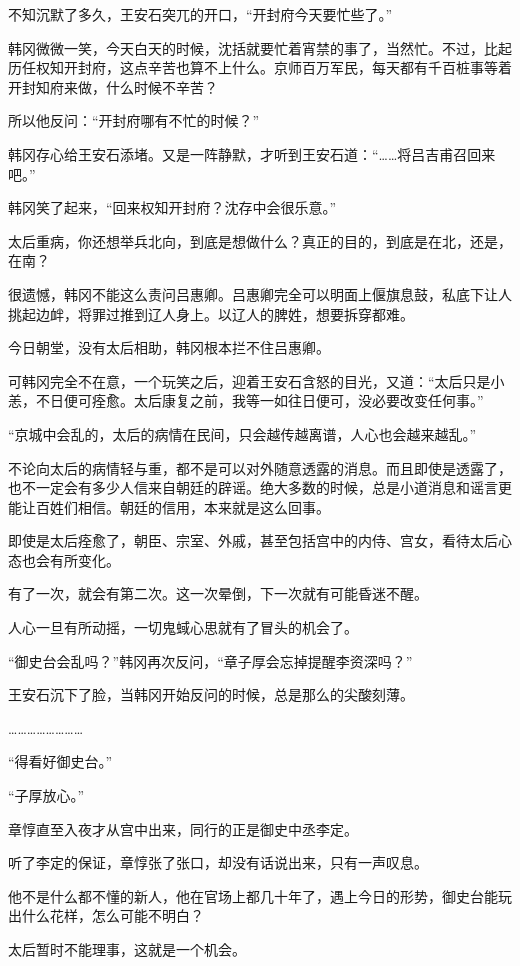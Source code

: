 不知沉默了多久，王安石突兀的开口，“开封府今天要忙些了。”

韩冈微微一笑，今天白天的时候，沈括就要忙着宵禁的事了，当然忙。不过，比起历任权知开封府，这点辛苦也算不上什么。京师百万军民，每天都有千百桩事等着开封知府来做，什么时候不辛苦？

所以他反问：“开封府哪有不忙的时候？”

韩冈存心给王安石添堵。又是一阵静默，才听到王安石道：“……将吕吉甫召回来吧。”

韩冈笑了起来，“回来权知开封府？沈存中会很乐意。”

太后重病，你还想举兵北向，到底是想做什么？真正的目的，到底是在北，还是，在南？

很遗憾，韩冈不能这么责问吕惠卿。吕惠卿完全可以明面上偃旗息鼓，私底下让人挑起边衅，将罪过推到辽人身上。以辽人的脾姓，想要拆穿都难。

今日朝堂，没有太后相助，韩冈根本拦不住吕惠卿。

可韩冈完全不在意，一个玩笑之后，迎着王安石含怒的目光，又道：“太后只是小恙，不日便可痊愈。太后康复之前，我等一如往日便可，没必要改变任何事。”

“京城中会乱的，太后的病情在民间，只会越传越离谱，人心也会越来越乱。”

不论向太后的病情轻与重，都不是可以对外随意透露的消息。而且即使是透露了，也不一定会有多少人信来自朝廷的辟谣。绝大多数的时候，总是小道消息和谣言更能让百姓们相信。朝廷的信用，本来就是这么回事。

即使是太后痊愈了，朝臣、宗室、外戚，甚至包括宫中的内侍、宫女，看待太后心态也会有所变化。

有了一次，就会有第二次。这一次晕倒，下一次就有可能昏迷不醒。

人心一旦有所动摇，一切鬼蜮心思就有了冒头的机会了。

“御史台会乱吗？”韩冈再次反问，“章子厚会忘掉提醒李资深吗？”

王安石沉下了脸，当韩冈开始反问的时候，总是那么的尖酸刻薄。

……………………

“得看好御史台。”

“子厚放心。”

章惇直至入夜才从宫中出来，同行的正是御史中丞李定。

听了李定的保证，章惇张了张口，却没有话说出来，只有一声叹息。

他不是什么都不懂的新人，他在官场上都几十年了，遇上今日的形势，御史台能玩出什么花样，怎么可能不明白？

太后暂时不能理事，这就是一个机会。


